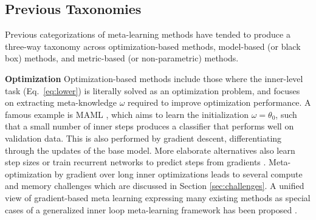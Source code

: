 \documentclass[10pt,journal,compsoc]{IEEEtran}
\newcommand{\keypoint}[1]{\vspace{0.1cm}\noindent\textbf{#1}\quad}
\begin{document}
\subsection{Previous Taxonomies}
\label{sec:alg}
Previous \cite{yao2020automated,lee2018mtnetmaml} categorizations of meta-learning methods have tended to produce a three-way taxonomy across optimization-based methods, model-based (or black box) methods, and metric-based (or non-parametric) methods.

\keypoint{Optimization} Optimization-based methods include those where the inner-level task (Eq.~\ref{eq:lower}) is literally solved as an optimization problem, and focuses on extracting meta-knowledge $\omega$ required to improve optimization performance. A famous example is MAML \cite{finn2017maml}, which aims to learn the initialization $\omega = \theta_0$, such that a small number of inner steps produces a classifier that performs well on validation data. This is also performed by gradient descent, differentiating through the updates of the base model. More elaborate alternatives also learn step sizes \cite{li2017meta,antoniou2018maml} or train recurrent networks to predict steps from gradients \cite{ravi2016optimization,li2017learntooptimize,andrychowicz2016graddescgraddesc}. Meta-optimization by gradient over long inner optimizations leads to several compute and memory challenges which are discussed in Section \ref{sec:challenges}. A unified view of gradient-based meta learning expressing many existing methods as special cases of a generalized inner loop meta-learning framework has been proposed \cite{grefenstette2019generalized}. 
\end{document}
